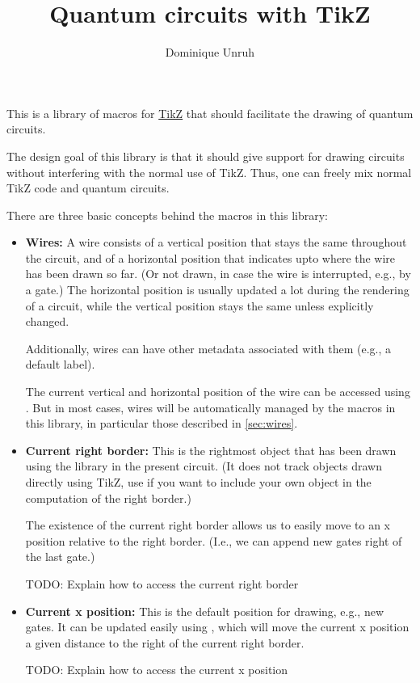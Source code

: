 \documentclass[a4paper]{article}
\makeatletter
\newcommand\nobsstring[1]{{\escapechar=-1\xdef\@tempa{\string#1}}}
\DeclareRobustCommand\macrolink[1]{\nobsstring#1\hyperref[command-\@tempa]{\texttt{\string#1}}}
\makeatother
\begin{document}
\title{Quantum circuits with TikZ}
\author{Dominique Unruh}
\maketitle

This is a library of macros for \href{https://sourceforge.net/projects/pgf/}{TikZ} that should facilitate the
drawing of quantum circuits.

The design goal of this library is that it should give support for
drawing circuits without interfering with the normal use of
TikZ. Thus, one can freely mix normal TikZ code and quantum circuits.

There are three basic concepts behind the macros in this library:
\begin{itemize}
\item \textbf{Wires:} A wire consists of a vertical position that
  stays the same throughout the circuit, and of a horizontal position
  that indicates upto where the wire has been drawn so far. (Or not
  drawn, in case the wire is interrupted, e.g., by a gate.) The
  horizontal position is usually updated a lot during the rendering of
  a circuit, while the vertical position stays the same unless
  explicitly changed.

  Additionally, wires can have other metadata associated with them
  (e.g., a default label).
  
  The current vertical and horizontal position of the wire can be
  accessed using \macrolink{\getWireCoord}. But in most cases, wires
  will be automatically managed by the macros in this library, in
  particular those described in \autoref{sec:wires}.
\item \textbf{Current right border:} This is the rightmost object that
  has been drawn using the library in the present circuit. (It does
  not track objects drawn directly using TikZ, use
  \macrolink{\registerRightBorderCandidate} if you want to include
  your own object in the computation of the right border.)

  The existence of the current right border allows us to easily move
  to an x position relative to the right border. (I.e., we can append
  new gates right of the last gate.)
  
  TODO: Explain how to access the current right border
\item \textbf{Current x position:} This is the default position for
  drawing, e.g., new gates. It can be updated easily using
  \macrolink\stepForward, which will move the current x position a
  given distance to the right of the current right border.

  TODO: Explain how to access the current x position
\end{itemize}
\end{document}
